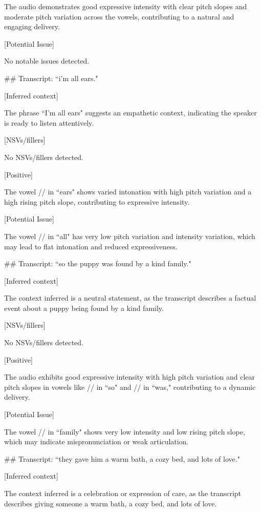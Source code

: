 \begin{tcolorbox}[blue_box, title = {{Audio Sample 1 : Ground-truth Human-likeness Rating = 2.0}}]
[Positive]  

The audio demonstrates good expressive intensity with clear pitch slopes and moderate pitch variation across the vowels, contributing to a natural and engaging delivery.


[Potential Issue]  

No notable issues detected.


\#\# Transcript: ``i'm all ears."

[Inferred context]  

The phrase ``I'm all ears" suggests an empathetic context, indicating the speaker is ready to listen attentively.


[NSVs/fillers]  

No NSVs/fillers detected.


[Positive]  

The vowel // in ``ears" shows varied intonation with high pitch variation and a high rising pitch slope, contributing to expressive intensity.


[Potential Issue]  

The vowel // in ``all" has very low pitch variation and intensity variation, which may lead to flat intonation and reduced expressiveness.


\#\# Transcript: ``so the puppy was found by a kind family."

[Inferred context]  

The context inferred is a neutral statement, as the transcript describes a factual event about a puppy being found by a kind family.


[NSVs/fillers]  

No NSVs/fillers detected.


[Positive]  

The audio exhibits good expressive intensity with high pitch variation and clear pitch slopes in vowels like // in ``so" and // in ``was," contributing to a dynamic delivery.


[Potential Issue]  

The vowel // in ``family" shows very low intensity and low rising pitch slope, which may indicate mispronunciation or weak articulation.


\#\# Transcript: ``they gave him a warm bath, a cozy bed, and lots of love."

[Inferred context]  

The context inferred is a celebration or expression of care, as the transcript describes giving someone a warm bath, a cozy bed, and lots of love.



\end{tcolorbox}
